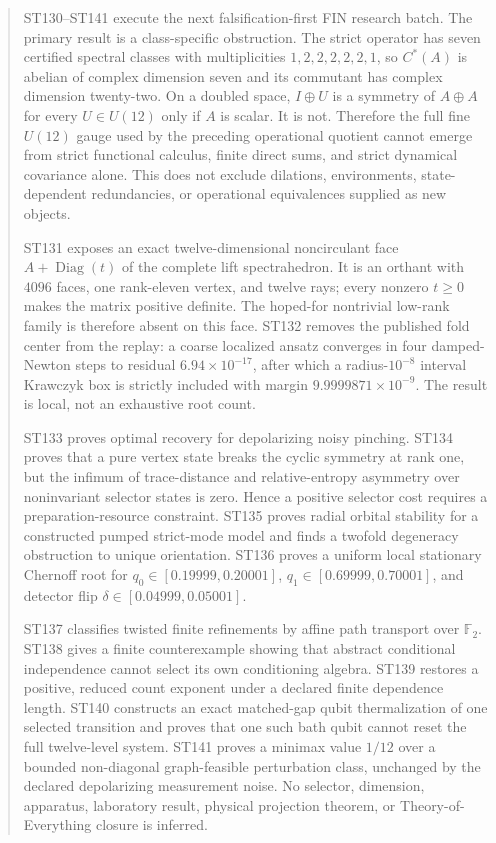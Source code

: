 \documentclass[11pt,a4paper]{article}
\begin{document}
\begin{abstract}
ST130--ST141 execute the next falsification-first FIN research batch. The primary result is a class-specific obstruction. The strict operator has seven certified spectral classes with multiplicities $1,2,2,2,2,2,1$, so $C^*(A)$ is abelian of complex dimension seven and its commutant has complex dimension twenty-two. On a doubled space, $I\oplus U$ is a symmetry of $A\oplus A$ for every $U\in U(12)$ only if $A$ is scalar. It is not. Therefore the full fine $U(12)$ gauge used by the preceding operational quotient cannot emerge from strict functional calculus, finite direct sums, and strict dynamical covariance alone. This does not exclude dilations, environments, state-dependent redundancies, or operational equivalences supplied as new objects.

ST131 exposes an exact twelve-dimensional noncirculant face $A+\operatorname{Diag}(t)$ of the complete lift spectrahedron. It is an orthant with $4096$ faces, one rank-eleven vertex, and twelve rays; every nonzero $t\ge0$ makes the matrix positive definite. The hoped-for nontrivial low-rank family is therefore absent on this face. ST132 removes the published fold center from the replay: a coarse localized ansatz converges in four damped-Newton steps to residual $6.94\times10^{-17}$, after which a radius-$10^{-8}$ interval Krawczyk box is strictly included with margin $9.9999871\times10^{-9}$. The result is local, not an exhaustive root count.

ST133 proves optimal recovery for depolarizing noisy pinching. ST134 proves that a pure vertex state breaks the cyclic symmetry at rank one, but the infimum of trace-distance and relative-entropy asymmetry over noninvariant selector states is zero. Hence a positive selector cost requires a preparation-resource constraint. ST135 proves radial orbital stability for a constructed pumped strict-mode model and finds a twofold degeneracy obstruction to unique orientation. ST136 proves a uniform local stationary Chernoff root for $q_0\in[0.19999,0.20001]$, $q_1\in[0.69999,0.70001]$, and detector flip $\delta\in[0.04999,0.05001]$.

ST137 classifies twisted finite refinements by affine path transport over $\mathbb F_2$. ST138 gives a finite counterexample showing that abstract conditional independence cannot select its own conditioning algebra. ST139 restores a positive, reduced count exponent under a declared finite dependence length. ST140 constructs an exact matched-gap qubit thermalization of one selected transition and proves that one such bath qubit cannot reset the full twelve-level system. ST141 proves a minimax value $1/12$ over a bounded non-diagonal graph-feasible perturbation class, unchanged by the declared depolarizing measurement noise. No selector, dimension, apparatus, laboratory result, physical projection theorem, or Theory-of-Everything closure is inferred.
\end{abstract}
\end{document}
